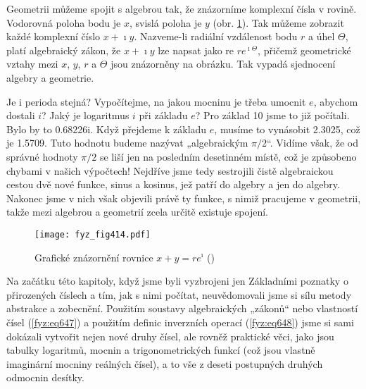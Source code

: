     Geometrii můžeme spojit s algebrou tak, že znázorníme komplexní čísla v rovině. Vodorovná poloha
    bodu je \(x\), svislá poloha je \(y\) (obr. \ref{fyz:fig414}). Tak můžeme zobrazit každé
    komplexní číslo \(x + \imath y\). Nazveme-li radiální vzdálenost bodu \(r\) a úhel
    \(\varTheta\), platí algebraický zákon, že \(x + \imath y\) lze napsat jako re
    \(re^{\imath\varTheta}\), přičemž geometrické vztahy mezi \(x\), \(y\), \(r\) a \(\varTheta\)
    jsou znázorněny na obrázku. Tak vypadá sjednocení algebry a geometrie.

    Je i perioda stejná? Vypočítejme, na jakou mocninu je třeba umocnit \(e\), abychom dostali
    \(i\)? Jaký je logaritmus \(i\) při základu \(e\)? Pro základ \num{10} jsme to již počítali.
    Bylo by to \num{0.68226i}. Když přejdeme k základu \(e\), musíme to vynásobit \num{2.3025}, což
    je \num{1.5709}. Tuto hodnotu budeme nazývat „algebraickým \(\pi/2\)“. Vidíme však, že od
    správné hodnoty \(\pi/2\) se liší jen na posledním desetinném místě, což je způsobeno chybami v
    našich výpočtech! Nejdříve jsme tedy sestrojili čistě algebraickou cestou dvě nové funkce, sinus
    a kosinus, jež patří do algebry a jen do algebry. Nakonec jsme v nich však objevili právě ty
    funkce, s nimiž pracujeme v geometrii, takže mezi algebrou a geometrií zcela určitě existuje
    spojení.

    \begin{figure}[ht!] %
      \centering
      \texttt{[image: fyz\_fig414.pdf]}
      \caption{Grafické znázornění rovnice \(x + y = re^\imath\) (\cite[s.~306]{Feynman01})}
      \label{fyz:fig414}
    \end{figure}

    Na začátku této kapitoly, když jsme byli vyzbrojeni jen Základními poznatky o přirozených
    číslech a tím, jak s nimi počítat, neuvědomovali jsme si sílu metody abstrakce a zobecnění.
    Použitím soustavy algebraických „zákonů“ nebo vlastností čísel (\ref{fyz:eq647}) a použitím
    deﬁnic inverzních operací (\ref{fyz:eq648}) jsme si sami dokázali vytvořit nejen nové druhy
    čísel, ale rovněž praktické věci, jako jsou tabulky logaritmů, mocnin a trigonometrických funkcí
    (což jsou vlastně imaginární mocniny reálných čísel), a to vše z deseti postupných druhých
    odmocnin desítky.

